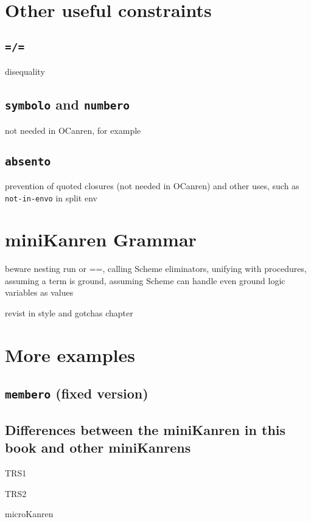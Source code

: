 \documentclass{book}
\begin{document}
\section{Other useful constraints}

\subsection{\texttt{=/=}}

disequality

\subsection{\texttt{symbolo} and \texttt{numbero}}

not needed in OCanren, for example

\subsection{\texttt{absento}}

prevention of quoted closures (not needed in OCanren) and other uses,
such as \texttt{not-in-envo} in split env

\section{miniKanren Grammar}

beware nesting run or ==, calling Scheme eliminators, unifying with procedures, assuming a term is ground, assuming Scheme can handle even ground logic variables as values

revist in style and gotchas chapter

\section{More examples}

\subsection{\texttt{membero} (fixed version)}

\subsection{Differences between the miniKanren in this book and other miniKanrens}

TRS1

TRS2

microKanren
\end{document}
